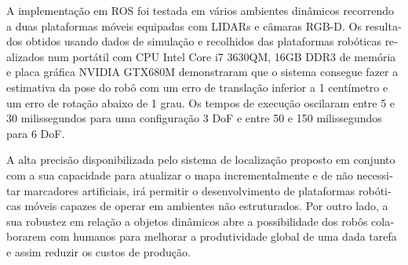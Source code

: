 \begin{otherlanguage}{portuguese}
A implementação em ROS foi testada em vários ambientes dinâmicos recorrendo a duas plataformas móveis equipadas com LIDARs e câmaras RGB-D. Os resultados obtidos usando dados de simulação e recolhidos das plataformas robóticas realizados num portátil com CPU Intel Core i7 3630QM, 16GB DDR3 de memória e placa gráfica NVIDIA GTX680M demonstraram que o sistema consegue fazer a estimativa da pose do robô com um erro de translação inferior a 1 centímetro e um erro de rotação abaixo de 1 grau. Os tempos de execução oscilaram entre 5 e 30 milissegundos para uma configuração 3 DoF e entre 50 e 150 milissegundos para 6 DoF.

A alta precisão disponibilizada pelo sistema de localização proposto em conjunto com a sua capacidade para atualizar o mapa incrementalmente e de não necessitar marcadores artificiais, irá permitir o desenvolvimento de plataformas robóticas móveis capazes de operar em ambientes não estruturados. Por outro lado, a sua robustez em relação a objetos dinâmicos abre a possibilidade dos robôs colaborarem com humanos para melhorar a produtividade global de uma dada tarefa e assim reduzir os custos de produção.

\end{otherlanguage}
